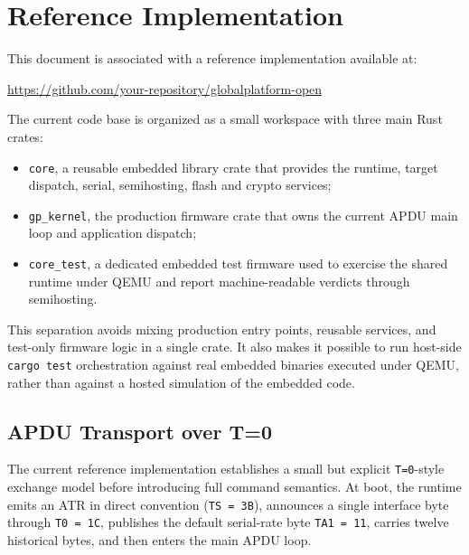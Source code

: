 \chapter{Reference Implementation}

This document is associated with a reference implementation available at:

\begin{center}
\url{https://github.com/your-repository/globalplatform-open}
\end{center}

The current code base is organized as a small workspace with three main
Rust crates:

\begin{itemize}
\item \texttt{core}, a reusable embedded library crate that provides the
  runtime, target dispatch, serial, semihosting, flash and crypto
  services;
\item \texttt{gp\_kernel}, the production firmware crate that owns the
  current APDU main loop and application dispatch;
\item \texttt{core\_test}, a dedicated embedded test firmware used to
  exercise the shared runtime under QEMU and report machine-readable
  verdicts through semihosting.
\end{itemize}

This separation avoids mixing production entry points, reusable
services, and test-only firmware logic in a single crate. It also makes
it possible to run host-side \texttt{cargo test} orchestration against
real embedded binaries executed under QEMU, rather than against a hosted
simulation of the embedded code.

\section{APDU Transport over T=0}
\label{sec:impl-apdu-t0}

The current reference implementation establishes a small but explicit
\texttt{T=0}-style exchange model before introducing full command
semantics. At boot, the runtime emits an ATR in direct convention
(\texttt{TS = 3B}), announces a single interface byte through
\texttt{T0 = 1C}, publishes the default serial-rate byte
\texttt{TA1 = 11}, carries twelve historical bytes, and then enters the
main APDU loop.

